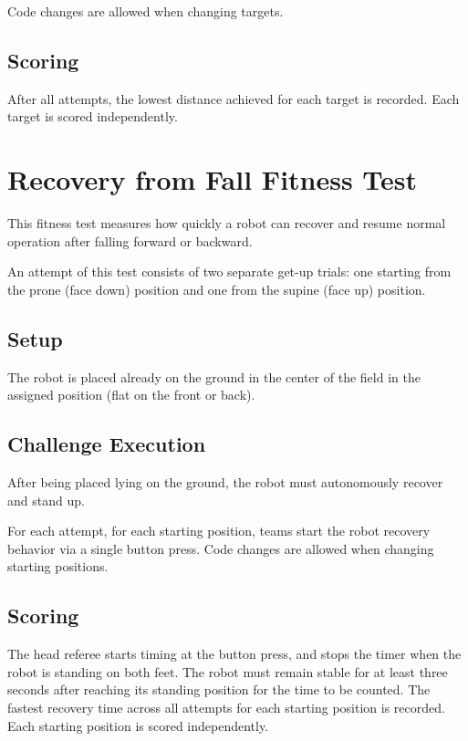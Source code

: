 Code changes are allowed when changing targets.

\subsection{Scoring}
After all attempts, the lowest distance achieved for each target is recorded. 
Each target is scored independently.

\section{Recovery from Fall Fitness Test}
This fitness test measures how quickly a robot can recover and resume normal operation after falling forward or backward.

An attempt of this test consists of two separate get-up trials: one starting from the prone (face down) position and one from the supine (face up) position.

\subsection{Setup}
The robot is placed already on the ground in the center of the field in the assigned position (flat on the front or back).

\subsection{Challenge Execution}
After being placed lying on the ground, the robot must autonomously recover and stand up.

For each attempt, for each starting position, teams start the robot recovery behavior via a single button press.
Code changes are allowed when changing starting positions.

\subsection{Scoring}
The head referee starts timing at the button press, and stops the timer when the robot is standing on both feet.
The robot must remain stable for at least three seconds after reaching its standing position for the time to be counted.
The fastest recovery time across all attempts for each starting position is recorded.
Each starting position is scored independently.